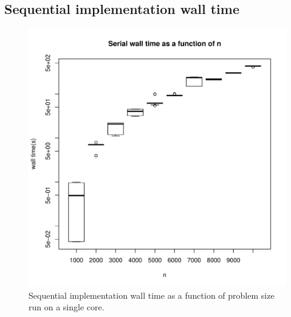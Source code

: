 \documentclass{article}
\begin{document}
\subsection{Sequential implementation wall time}
\begin{figure}[H]
  \begin{center}
    \includegraphics[width=12cm]{../analysis/serial_walltime_mkl.pdf}
  \end{center}
  \caption{Sequential implementation wall time as a function of problem size run on a single core.}
  \label{serial_walltime}
\end{figure}
\end{document}
